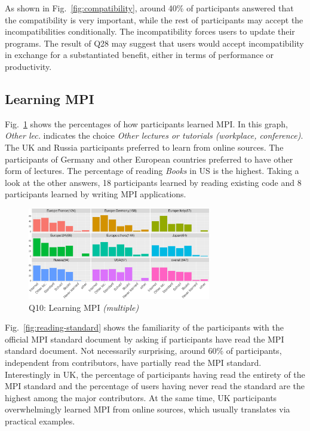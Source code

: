 \documentclass[preprint,5p,times]{elsarticle}
\def\myquote#1{{\it #1}}
\newcommand{\revision}[2]{{\color{blue}#2}}
\def\countries{contributors\xspace{}}%
\def\mcountries{major contributors\xspace{}}%
\begin{document}
As shown in Fig.~\ref{fig:compatibility}, around 40\% of participants answered
that the compatibility is very important, while the rest of participants may
accept the \revision{incompatibility}{incompatibilities} conditionally. The incompatibility forces users to
update their programs. The result of Q28 may \revision{suggests}{suggest} that users would accept
incompatibility in exchange \revision{of}{for} a substantiated benefit, either in terms of
performance or productivity.

\subsection{Learning MPI}\label{sec:learning-mpi}

Fig.~\ref{fig:learning-mpi} shows the percentages of how participants learned
MPI. In this graph, \myquote{Other lec.} indicates the choice \myquote{Other
lectures or tutorials (workplace, conference)}. The UK and Russia participants
preferred to learn from online sources. The participants of Germany and other
European countries preferred to have other form of lectures. The percentage of
reading \myquote{Books} in US is the highest. Taking a look at the other
answers, 18 participants learned by reading existing code and 8 participants
learned by writing MPI applications.

\begin{figure}[tb]
\begin{center}
\includegraphics[width=8.0cm]{R-scripts/Q10.pdf}
\vspace{-1.5mm}
\caption{Q10: Learning MPI {\it(multiple)}}
\label{fig:learning-mpi}
\vspace{-3mm}%
\end{center}
\end{figure}

Fig.~\ref{fig:reading-standard} shows the familiarity of the participants with
the official MPI standard document by asking if participants have read the MPI
standard document. Not necessarily surprising, around 60\% of participants,
independent from \countries, have partially read the MPI standard. Interestingly
in UK, \revision{the percentage of participants having read the entirety of the MPI
standard is similar to the percentage of users having never read the
standard.}
{the percentage of participants having read the entirety of the MPI
standard and the percentage of users having never read the
standard are the highest among the \mcountries.}
\revision{In}{At the} same time, UK participants overwhelmingly learned MPI from online sources,
which usually translates via practical examples.
\end{document}
